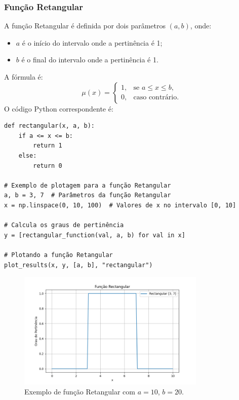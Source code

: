 \documentclass[a4paper,12pt]{article}
\begin{document}
\subsubsection{Função Retangular}
A função Retangular é definida por dois parâmetros $(a, b)$, onde:
\begin{itemize}
    \item $a$ é o início do intervalo onde a pertinência é 1;
    \item $b$ é o final do intervalo onde a pertinência é 1.
\end{itemize}
A fórmula é:
\[
\mu(x) =
\begin{cases}
1, & \text{se } a \leq x \leq b, \\
0, & \text{caso contrário.}
\end{cases}
\]
O código Python correspondente é:
\begin{verbatim}
def rectangular(x, a, b):
    if a <= x <= b:
        return 1
    else:
        return 0

# Exemplo de plotagem para a função Retangular
a, b = 3, 7  # Parâmetros da função Retangular
x = np.linspace(0, 10, 100)  # Valores de x no intervalo [0, 10]

# Calcula os graus de pertinência
y = [rectangular_function(val, a, b) for val in x]

# Plotando a função Retangular
plot_results(x, y, [a, b], "rectangular")

\end{verbatim}
\begin{figure}[H]
    \centering
    \includegraphics[width=0.8\textwidth]{img/rectangular.png}
    \caption{Exemplo de função Retangular com $a=10$, $b=20$.}
\end{figure}
\end{document}
